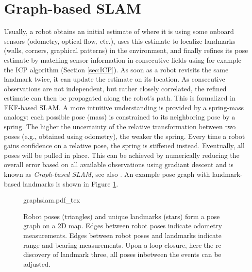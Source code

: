 \section{Graph-based SLAM}
Usually, a robot obtains an initial estimate of where it is using some onboard sensors (odometry, optical flow, etc.), uses this estimate to localize landmarks (walls, corners, graphical patterns) in the environment, and finally refines its pose estimate by matching sensor information in consecutive fields using for example the ICP algorithm (Section \ref{sec:ICP}). As soon as a robot revisits the same landmark twice, it can update the estimate on its location. As consecutive observations are not independent, but rather closely correlated, the refined estimate can then be propagated along the robot's path. This is formalized in EKF-based SLAM. A more intuitive understanding is provided by a spring-mass analogy: each possible pose (mass) is constrained to its neighboring pose by a spring. The higher the uncertainty of the relative transformation between two poses (e.g., obtained using odometry), the weaker the spring. Every time a robot gains confidence on a relative pose, the spring is stiffened instead. Eventually, all poses will be pulled in place. This can be achieved by numerically reducing the overall error based on all available observations using gradiant descent and is known as \emph{Graph-based SLAM}, see also \cite{grisetti2010tutorial}. An example pose graph with landmark-based landmarks is shown in Figure \ref{fig:graphslam}.

\begin{figure}
\centering
    \def\svgwidth{0.6\textwidth}
    {graphslam.pdf_tex}
    \caption{Robot poses (triangles) and unique landmarks (stars) form a pose graph on a 2D map. Edges between robot poses indicate odometry measurements. Edges between robot poses and landmarks indicate range and bearing measurements. Upon a loop closure, here the re-discovery of landmark three, all poses inbetween the events can be adjusted. }\label{fig:graphslam}
\end{figure}

